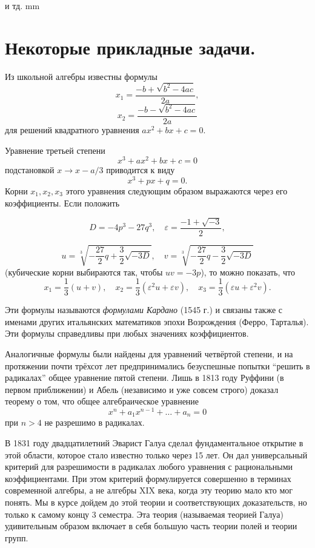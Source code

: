 \documentclass[12pt,english,russian]{article}
\begin{document}
	и тд.
	 mm
	

	
	\section{\bf Некоторые прикладные задачи.}
	
	Из школьной алгебры известны формулы
	$$x_1=\frac{-b+\sqrt{b^2-4ac}}{2a},$$
	$$x_2=\frac{-b-\sqrt{b^2-4ac}}{2a}$$ 
	для решений квадратного уравнения $ax^2+bx+c=0$.
	
	Уравнение третьей степени
	$$x^3+ax^2+bx+c=0$$
	подстановкой $x \to x-a/3$ приводится к виду
	$$x^3+px+q=0.$$
	Корни $x_1, x_2, x_3$
	этого уравнения следующим образом выражаются 
	через его коэффициенты. Если положить
	
	$$
		D=-4p^3-27q^3, \quad \varepsilon=\frac{-1+\sqrt{-3}}{2},
	$$
	
	$$
		u=\sqrt[3]{-\frac{27}{2}q+\frac{3}{2}\sqrt{-3D}}, \quad v=\sqrt[3]{-\frac{27}{2}q-\frac{3}{2}\sqrt{-3D}}
	$$
	(кубические корни выбираются так, чтобы $uv=-3p$), то можно
	показать, что
	$$x_1=\frac{1}{3}(u+v), \quad x_2=\frac{1}{3}(\varepsilon^2u+\varepsilon v), \quad x_3=\frac{1}{3}(\varepsilon u+\varepsilon^2v).$$
	
	Эти формулы называются
	\textit{формулами Кардано}
	(1545 г.) и связаны 
	также с именами других итальянских математиков эпохи
	Возрождения (Ферро, Тарталья). Эти формулы 
	справедливы при
	любых значениях коэффициентов.
	
	Аналогичные формулы были найдены для уравнений четвёртой 
	степени, и на протяжении почти трёхсот лет предпринимались 
	безуспешные попытки “решить в радикалах” общее уравнение 
	пятой степени. Лишь в 1813 году Руффини (в первом приближении) и Абель (независимо и уже совсем строго) доказал
	теорему о том, что общее алгебраическое уравнение
	$$x^n+a_1x^{n-1}+ \dots +a_n=0$$ при $n > 4$
	не разрешимо в радикалах.

	В 1831 году двадцатилетний Эварист Галуа сделал фундаментальное открытие
	 в этой области, которое стало известно только
	через 15 лет. Он дал универсальный критерий для разрешимости в
	радикалах любого уравнения с рациональными коэффициентами.
	При этом критерий формулируется совершенно в терминах современной алгебры, а не алгебры XIX века, когда эту теорию мало
	кто мог понять. Мы в курсе дойдем до этой теории и соответствующих доказательств, но только к самому концу 3 семестра.
	Эта теория (называемая теорией Галуа) удивительным образом
	включает в себя большую часть теории полей и теории групп.
\end{document}
